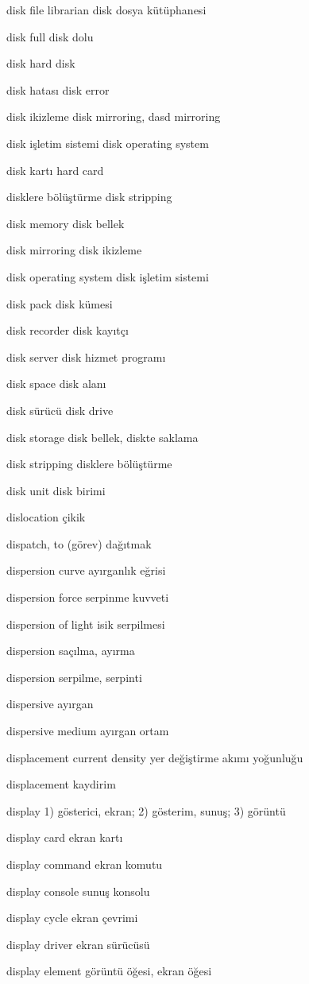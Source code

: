 \documentclass[12pt,fleqn]{article}\usepackage{../../common}
\begin{document}
disk file librarian disk dosya kütüphanesi

disk full disk dolu

disk hard disk

disk hatası disk error

disk ikizleme disk mirroring, dasd mirroring

disk işletim sistemi disk operating system

disk kartı hard card

disklere bölüştürme disk stripping

disk memory disk bellek

disk mirroring disk ikizleme

disk operating system disk işletim sistemi

disk pack disk kümesi

disk recorder disk kayıtçı

disk server disk hizmet programı

disk space disk alanı

disk sürücü disk drive

disk storage disk bellek, diskte saklama

disk stripping disklere bölüştürme

disk unit disk birimi

dislocation çikik

dispatch, to (görev) dağıtmak

dispersion curve ayırganlık eğrisi

dispersion force serpinme kuvveti

dispersion of light isik serpilmesi

dispersion saçılma, ayırma

dispersion serpilme, serpinti

dispersive ayırgan

dispersive medium ayırgan ortam

displacement current density yer değiştirme akımı yoğunluğu

displacement kaydirim

display 1) gösterici, ekran; 2) gösterim, sunuş; 3) görüntü

display card ekran kartı

display command ekran komutu

display console sunuş konsolu

display cycle ekran çevrimi

display driver ekran sürücüsü

display element görüntü öğesi, ekran öğesi
\end{document}
